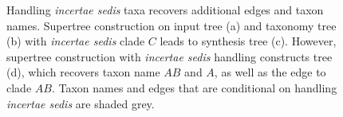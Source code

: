 \documentclass[english]{article}
\begin{document}
\begin{figure}
\hfill{}

\caption{\label{fig:Handling-incertae-sedis}Handling \emph{incertae sedis
}taxa recovers additional edges and taxon names. Supertree construction
on input tree (a) and taxonomy tree (b) with \emph{incertae sedis}
clade $C$ leads to synthesis tree (c). However, supertree construction
with \emph{incertae sedis} handling constructs tree (d), which recovers
taxon name $AB$ and $A$, as well as the edge to clade $AB$. Taxon
names and edges that are conditional on handling \emph{incertae sedis}
are shaded grey. }

\end{figure}
\end{document}

